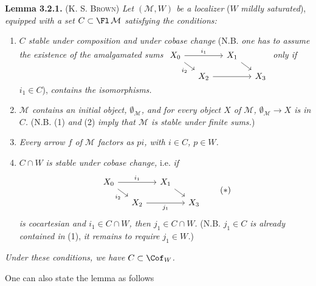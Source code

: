 \textbf{Lemma 3.2.1.} (K. S. \textsc{Brown}) \textit{Let $(\mathcal{M}, W)$ be a localizer} ($W$ \textit{mildly saturated}), \textit{equipped with a set $C \subset \Fl\,\mathcal{M}$ satisfying the conditions:}
\begin{enumerate}
\item[1)] \textit{$C$ stable under composition and under cobase change} (N.B. \textit{one has to assume the existence of the amalgamated sums}
$\begin{tikzcd}[ampersand replacement=\&, baseline=(\tikzcdmatrixname-1-1.base), row sep=small, column sep=small]
X_0 \arrow[rr, "i_1"] \arrow[dr, "i_2"'] \& \& X_1 \arrow[dr] \& \\
\& X_2 \arrow[rr] \& \& X_3
\end{tikzcd}$
\textit{only if $i_1 \in C$}), \textit{contains the isomorphisms.}
\item[2)] \textit{$\mathcal{M}$ contains an initial object, $\emptyset_{\mathcal{M}}$, and for every object $X$ of $\mathcal{M}$, $\emptyset_{\mathcal{M}} \longrightarrow X$ is in $C$.} (N.B. (1) \textit{and} (2) \textit{imply that $\mathcal{M}$ is stable under finite sums.})
\item[3)] \textit{Every arrow $f$ of $\mathcal{M}$ factors as $pi$, with $i \in C$, $p \in W$.}
\item[4)] \textit{$C \cap W$ is stable under cobase change,} i.e. \textit{if}
\[
\begin{tikzcd}[ampersand replacement=\&, row sep=small, column sep=small]
X_0 \arrow[rr, "i_1"] \arrow[dr, "i_2"'] \& \& X_1 \arrow[dr] \& \\
\& X_2 \arrow[rr, "j_1"'] \& \& X_3
\end{tikzcd}
\tag*{$(*)$}
\]
\textit{is cocartesian and $i_1 \in C \cap W$, then $j_1 \in C \cap W$.} (N.B. \textit{$j_1 \in C$ is already contained in} (1), \textit{it remains to require $j_1 \in W$.})
\end{enumerate}
\textit{Under these conditions, we have $C \subset \Cof_W$.}

One can also state the lemma as follows

